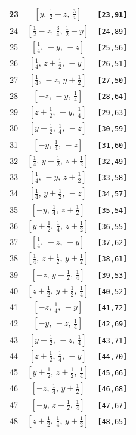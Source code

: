 \documentclass[fleqn,8pt]{jsarticle}
\begin{document}
\begin{longtable}{ccc}
23 & $\left[ y,\, \frac{1}{2} - z,\, \frac{3}{4} \right]$ & {\tt [23,91]} \\ \hline
24 & $\left[ \frac{1}{2} - z,\, \frac{3}{4},\, \frac{1}{2} - y \right]$ & {\tt [24,89]} \\ \hline
25 & $\left[ \frac{1}{4},\, - y,\, - z \right]$ & {\tt [25,56]} \\ \hline
26 & $\left[ \frac{1}{4},\, z + \frac{1}{2},\, - y \right]$ & {\tt [26,51]} \\ \hline
27 & $\left[ \frac{1}{4},\, - z,\, y + \frac{1}{2} \right]$ & {\tt [27,50]} \\ \hline
28 & $\left[ - z,\, - y,\, \frac{1}{4} \right]$ & {\tt [28,64]} \\ \hline
29 & $\left[ z + \frac{1}{2},\, - y,\, \frac{1}{4} \right]$ & {\tt [29,63]} \\ \hline
30 & $\left[ y + \frac{1}{2},\, \frac{1}{4},\, - z \right]$ & {\tt [30,59]} \\ \hline
31 & $\left[ - y,\, \frac{1}{4},\, - z \right]$ & {\tt [31,60]} \\ \hline
32 & $\left[ \frac{1}{4},\, y + \frac{1}{2},\, z + \frac{1}{2} \right]$ & {\tt [32,49]} \\ \hline
33 & $\left[ \frac{1}{4},\, - y,\, z + \frac{1}{2} \right]$ & {\tt [33,58]} \\ \hline
34 & $\left[ \frac{1}{4},\, y + \frac{1}{2},\, - z \right]$ & {\tt [34,57]} \\ \hline
35 & $\left[ - y,\, \frac{1}{4},\, z + \frac{1}{2} \right]$ & {\tt [35,54]} \\ \hline
36 & $\left[ y + \frac{1}{2},\, \frac{1}{4},\, z + \frac{1}{2} \right]$ & {\tt [36,55]} \\ \hline
37 & $\left[ \frac{1}{4},\, - z,\, - y \right]$ & {\tt [37,62]} \\ \hline
38 & $\left[ \frac{1}{4},\, z + \frac{1}{2},\, y + \frac{1}{2} \right]$ & {\tt [38,61]} \\ \hline
39 & $\left[ - z,\, y + \frac{1}{2},\, \frac{1}{4} \right]$ & {\tt [39,53]} \\ \hline
40 & $\left[ z + \frac{1}{2},\, y + \frac{1}{2},\, \frac{1}{4} \right]$ & {\tt [40,52]} \\ \hline
41 & $\left[ - z,\, \frac{1}{4},\, - y \right]$ & {\tt [41,72]} \\ \hline
42 & $\left[ - y,\, - z,\, \frac{1}{4} \right]$ & {\tt [42,69]} \\ \hline
43 & $\left[ y + \frac{1}{2},\, - z,\, \frac{1}{4} \right]$ & {\tt [43,71]} \\ \hline
44 & $\left[ z + \frac{1}{2},\, \frac{1}{4},\, - y \right]$ & {\tt [44,70]} \\ \hline
45 & $\left[ y + \frac{1}{2},\, z + \frac{1}{2},\, \frac{1}{4} \right]$ & {\tt [45,66]} \\ \hline
46 & $\left[ - z,\, \frac{1}{4},\, y + \frac{1}{2} \right]$ & {\tt [46,68]} \\ \hline
47 & $\left[ - y,\, z + \frac{1}{2},\, \frac{1}{4} \right]$ & {\tt [47,67]} \\ \hline
48 & $\left[ z + \frac{1}{2},\, \frac{1}{4},\, y + \frac{1}{2} \right]$ & {\tt [48,65]} \\
\end{longtable}
\end{document}
